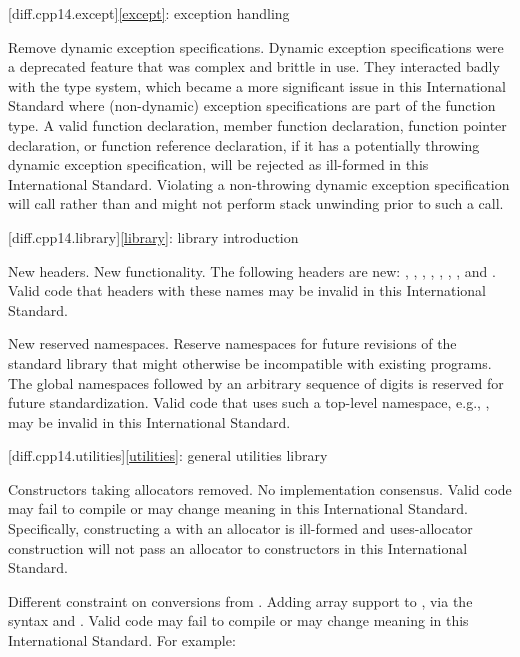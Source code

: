 [diff.cpp14.except]{\ref{except}: exception handling}

\change
Remove dynamic exception specifications.
\rationale
Dynamic exception specifications were a deprecated feature
that was complex and brittle in use.
They interacted badly with the type system,
which became a more significant issue in this International Standard
where (non-dynamic) exception specifications are part of the function type.
\effect
A valid \CppXIV{} function declaration,
member function declaration,
function pointer declaration,
or function reference declaration,
if it has a potentially throwing dynamic exception specification,
will be rejected as ill-formed in this International Standard.
Violating a non-throwing dynamic exception specification
will call 
rather than 
and might not perform stack unwinding prior to such a call.

[diff.cpp14.library]{\ref{library}: library introduction}

\change
New headers.
\rationale
New functionality.
\effect
The following \Cpp{} headers are new:
,
,
,
,
,
,
,
and
.
Valid \CppXIV{} code that  headers with these names may be
invalid in this International Standard.

\change
New reserved namespaces.
\rationale
Reserve namespaces for future revisions of the standard library
that might otherwise be incompatible with existing programs.
\effect
The global namespaces 
followed by an arbitrary sequence of digits
is reserved for future standardization.
Valid \CppXIV{} code that uses such a top-level namespace,
e.g., , may be invalid in this International Standard.

[diff.cpp14.utilities]{\ref{utilities}: general utilities library}

\change
Constructors taking allocators removed.
\rationale
No implementation consensus.
\effect
Valid \CppXIV{} code may fail to compile or may change meaning in this
International Standard. Specifically, constructing a  with
an allocator is ill-formed and uses-allocator construction will not pass an
allocator to  constructors in this International Standard.

\change
Different constraint on conversions from .
\rationale
Adding array support to ,
via the syntax  and .
\effect
Valid \CppXIV{} code may fail to compile or may change meaning in this
International Standard.
For example:


